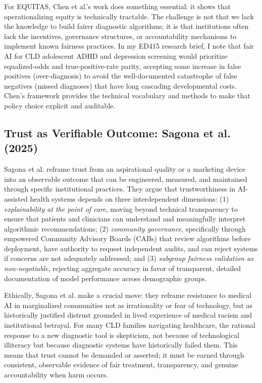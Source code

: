 \documentclass[12pt,letterpaper]{article}
\begin{document}
For EQUITAS, Chen et al.'s work does something essential: it shows that operationalizing equity is technically tractable. The challenge is not that we lack the knowledge to build fairer diagnostic algorithms; it is that institutions often lack the incentives, governance structures, or accountability mechanisms to implement known fairness practices. In my ED415 research brief, I note that fair AI for CLD adolescent ADHD and depression screening would prioritize equalized-odds and true-positive-rate parity, accepting some increase in false positives (over-diagnosis) to avoid the well-documented catastrophe of false negatives (missed diagnoses) that have long cascading developmental costs.\cite{garcia_ed415} Chen's framework provides the technical vocabulary and methods to make that policy choice explicit and auditable.

\subsection{Trust as Verifiable Outcome: Sagona et al. (2025)}

Sagona et al. reframe trust from an aspirational quality or a marketing device into an observable outcome that can be engineered, measured, and maintained through specific institutional practices.\cite{sagona2025} They argue that trustworthiness in AI-assisted health systems depends on three interdependent dimensions: (1) \textit{explainability at the point of care}, moving beyond technical transparency to ensure that patients and clinicians can understand and meaningfully interpret algorithmic recommendations; (2) \textit{community governance}, specifically through empowered Community Advisory Boards (CABs) that review algorithms before deployment, have authority to request independent audits, and can reject systems if concerns are not adequately addressed; and (3) \textit{subgroup fairness validation as non-negotiable}, rejecting aggregate accuracy in favor of transparent, detailed documentation of model performance across demographic groups.\cite{sagona2025}

Ethically, Sagona et al. make a crucial move: they reframe resistance to medical AI in marginalized communities not as irrationality or fear of technology, but as historically justified distrust grounded in lived experience of medical racism and institutional betrayal.\cite{sagona2025} For many CLD families navigating healthcare, the rational response to a new diagnostic tool is skepticism, not because of technological illiteracy but because diagnostic systems have historically failed them. This means that trust cannot be demanded or asserted; it must be earned through consistent, observable evidence of fair treatment, transparency, and genuine accountability when harm occurs.\cite{sagona2025}
\end{document}
